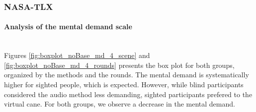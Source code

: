 \subsubsection{NASA-TLX}
\label{subsubsec:results_nasa_tlx_2}

\paragraph*{Analysis of the mental demand scale}\mbox{}\\

%
%
%

Figures \ref{fig:boxplot_noBase_md_4_scene} and \ref{fig:boxplot_noBase_md_4_rounds} presents the box plot for both groups, organized by the methods and the rounds. The mental demand is systematically higher for sighted people, which is expected. However, while blind participants considered the audio method less demanding, sighted participants prefered to the virtual cane. For both groups, we observe a decrease in the mental demand.

